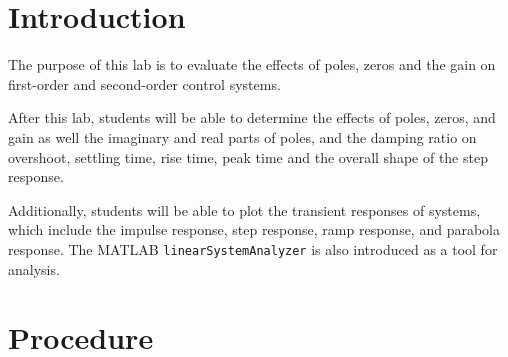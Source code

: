 \documentclass[11pt]{article}
\begin{document}
\section{Introduction}

The purpose of this lab is
to evaluate the effects of poles, zeros and the gain
on first-order and second-order control systems.

After this lab, students will be able
to determine the effects of poles, zeros, and gain
as well the imaginary and real parts of poles,
and the damping ratio
on overshoot, settling time, rise time, peak time
and the overall shape of the step response.

Additionally, students will be able to plot the transient responses of systems, which include
the impulse response, step response, ramp response, and parabola response. The MATLAB \texttt{linearSystemAnalyzer} is also introduced as a tool for analysis.

\section{Procedure}
\end{document}
